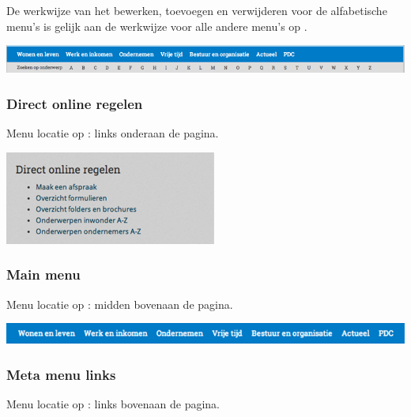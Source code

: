 De werkwijze van het bewerken, toevoegen en verwijderen voor de alfabetische menu's is gelijk aan de werkwijze voor alle andere menu's op \drupalpath{}.

\bigskip

\begin{center}
	\includegraphics[width=\textwidth]{img/menu3.png}
\end{center}


\subsubsection{Direct online regelen}\label{directonlineregelen}
Menu locatie op \drupalpath{}: links onderaan de pagina.
\bigskip

\begin{center}
	\includegraphics[width=\textwidth]{img/menu_directonline.png}
\end{center}

\bigskip

\subsubsection{Main menu}\label{mainmenu}
Menu locatie op \drupalpath{}: midden bovenaan de pagina.
\bigskip

\begin{center}
	\includegraphics[width=\textwidth]{img/menu_main.png}
\end{center}

\bigskip

\subsubsection{Meta menu links}\label{metamenulinks}
Menu locatie op \drupalpath{}: links bovenaan de pagina.
\bigskip

